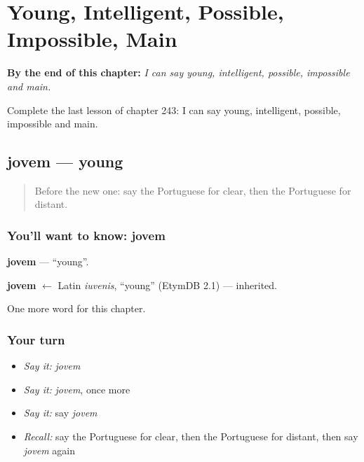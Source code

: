 
\chapter{Young, Intelligent, Possible, Impossible, Main}
\label{ch:pt-young-intelligent-possible-impossible-main}

\begin{chapteropening}
\textbf{By the end of this chapter:} \emph{I can say young, intelligent, possible, impossible and main.}

Complete the last lesson of chapter 243: I can say young, intelligent, possible, impossible and main.
\end{chapteropening}

\section[jovem]{jovem — young}

\label{lesson:PT-C243-jovem}



\begin{quote}
Before the new one: say the Portuguese for clear, then the Portuguese for distant.
\end{quote}

\subsection*{You'll want to know: jovem}
\textbf{jovem} — \textquotedblleft{}young\textquotedblright{}.

\begin{cousinweb}
\textbf{jovem} $\leftarrow$ Latin \emph{iuvenis}, \textquotedblleft{}young\textquotedblright{} (EtymDB 2.1) — inherited.
\end{cousinweb}

\begin{grammarlens}[title={What you've built}]
One more word for this chapter.
\end{grammarlens}

\subsection*{Your turn}
\begin{itemize}
\raggedright
  \item \emph{Say it:} \emph{jovem}
  \item \emph{Say it:} \emph{jovem}, once more
  \item \emph{Say it:} say \emph{jovem}
  \item \emph{Recall:} say the Portuguese for clear, then the Portuguese for distant, then say \emph{jovem} again
\end{itemize}

